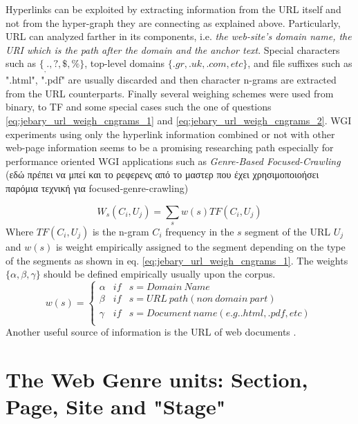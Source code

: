 Hyperlinks can be exploited by extracting information from the URL itself and not from the hyper-graph they are connecting as explained above. Particularly, URL can analyzed farther in its components, i.e. \textit{the web-site's domain name, the URI which is the path after the domain and the anchor text}. Special characters such as $\{_ , . , ?, \$ , \%\}$, top-level domains $\{.gr , .uk , .com, etc\}$, and file suffixes such as ".html", ".pdf" are usually discarded and then character n-grams are extracted from the URL counterparts. Finally several weighing schemes were used from binary, to TF and some special cases such the one of questions \ref{eq:jebary_url_weigh_cngrams_1} and \ref{eq:jebary_url_weigh_cngrams_2}. WGI experiments using only the hyperlink information combined or not with other web-page information seems to be a promising researching path especially for performance oriented WGI applications such as \textit{Genre-Based Focused-Crawling} \parencite{jebari2014pure_URL,jebari2015combination} (εδώ πρέπει να μπεί και το ρεφερενς από το μαστερ που έχει χρησιμοποιοήσει παρόμια τεχνική για focused-genre-crawling)

\begin{equation}\label{eq:jebary_url_weigh_cngrams_1}
	W_{s}(C_{i}, U_{j}) = \sum_{s} w(s) TF(C_{i}, U_{j})
\end{equation}
Where $TF(C_{i}, U_{j}) $ is the n-gram $C_{i}$ frequency in the $s$ segment of the URL $U_{j}$ and $w(s)$ is weight empirically assigned to the segment depending on the type of the segments as shown in eq. \ref{eq:jebary_url_weigh_cngrams_1}. The weights $\{\alpha,\beta,\gamma\}$ should be defined empirically usually upon the corpus. 
\begin{equation}\label{eq:jebary_url_weigh_cngrams_2}
	w(s) = \left\{
    	\begin{array}{lll}
        	\alpha & if & s = Domain\ Name \\
            \beta & if & s = URL\ path (non\ domain\ part) \\
            \gamma & if & s = Document\ name (e.g. .html, .pdf, etc) \\
         \end{array}
  \right.
\end{equation}
 Another useful source of information is the URL of web documents  \parencite{abramson2012_URL,jebari2014pure_URL,priyatam2013don_URL}.


\section{The Web Genre units: Section, Page, Site and "Stage"}


